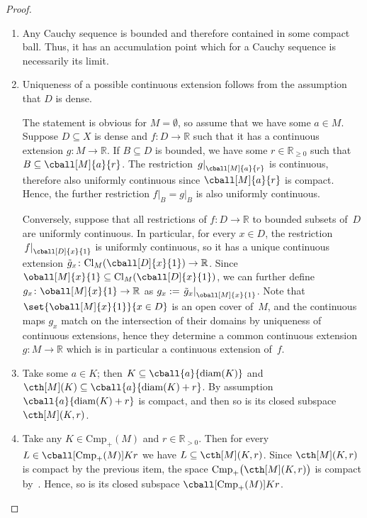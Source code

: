 \documentclass[11pt]{article}
\theoremstyle{plain}
\theoremstyle{definition}
\newcommand{\RR}{\mathbb{R}}
\newcommand{\rstr}[1]{\left.{#1}\right|}  %
\newcommand{\csub}{\mathrm{Cmp}}
\newcommand{\icsub}{\csub_{+}}
\newcommand{\cl}[1][]{\mathrm{Cl}_{#1}}
\begin{document}
\begin{proof}
\
\begin{enumerate}
\item
Any Cauchy sequence is bounded and therefore contained in some compact ball. Thus, it has an accumulation point which for a Cauchy sequence is necessarily its limit.
\item
Uniqueness of a possible continuous extension follows from the assumption that $D$ is dense.

The statement is obvious for $M = \emptyset$, so assume that we have some $a \in M$. Suppose $D \subseteq X$ is dense and $f\colon D \to \RR$ such that it has a continuous extension $g\colon M \to \RR$. If $B \subseteq D$ is bounded, we have some $r \in \RR_{\geq 0}$ such that $B \subseteq \cball[M]{a}{r}$. The restriction $\rstr{g}_{\cball[M]{a}{r}}$ is continuous, therefore also uniformly continuous since $\cball[M]{a}{r}$ is compact. Hence, the further restriction $\rstr{f}_{B} = \rstr{g}_{B}$ is also uniformly continuous.

Conversely, suppose that all restrictions of $f\colon D \to \RR$ to bounded subsets of~$D$ are uniformly continuous. In particular, for every $x \in D$, the restriction $\rstr{f}_{\cball[D]{x}{1}}$ is uniformly continuous, so it has a unique continuous extension $\tilde{g}_x\colon \cl[M](\cball[D]{x}{1}) \to \RR$. Since $\oball[M]{x}{1} \subseteq \cl[M](\cball[D]{x}{1})$, we can further define $g_x\colon \oball[M]{x}{1} \to \RR$ as $g_x := \rstr{\tilde{g}_x}_{\oball[M]{x}{1}}$. Note that $\set{\oball[M]{x}{1}}{x \in D}$ is an open cover of~$M$, and the continuous maps $g_x$ match on the intersection of their domains by uniqueness of continuous extensions, hence they determine a common continuous extension $g\colon M \to \RR$ which is in particular a continuous extension of~$f$.
\item
Take some $a \in K$; then $K \subseteq \cball{a}{\mathrm{diam}(K)}$ and $\cth[M](K) \subseteq \cball{a}{\mathrm{diam}(K) + r}$. By assumption $\cball{a}{\mathrm{diam}(K) + r}$ is compact, and then so is its closed subspace $\cth[M](K, r)$.
\item
Take any $K \in \icsub(M)$ and $r \in \RR_{> 0}$. Then for every $L \in \cball[\icsub(M)]{K}{r}$ we have $L \subseteq \cth[M](K, r)$. Since $\cth[M](K, r)$ is compact by the previous item, the space $\icsub\big(\cth[M](K, r)\big)$ is compact by~\cite[Theorem 7.3.8]{burago2001course}. Hence, so is its closed subspace $\cball[\icsub(M)]{K}{r}$.
\end{enumerate}
\end{proof}
\end{document}
